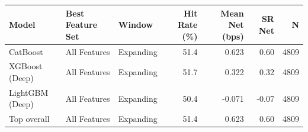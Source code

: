 \begin{tabular}{lllrrrr}
\toprule
Model & Best Feature Set & Window & Hit Rate (\%) & Mean Net (bps) & SR Net & N \\
\midrule
CatBoost & All Features & Expanding & 51.4 & 0.623 & 0.60 & 4809 \\
XGBoost (Deep) & All Features & Expanding & 51.7 & 0.322 & 0.32 & 4809 \\
LightGBM (Deep) & All Features & Expanding & 50.4 & -0.071 & -0.07 & 4809 \\
\midrule
Top overall & All Features & Expanding & 51.4 & 0.623 & 0.60 & 4809 \\
\bottomrule
\end{tabular}
